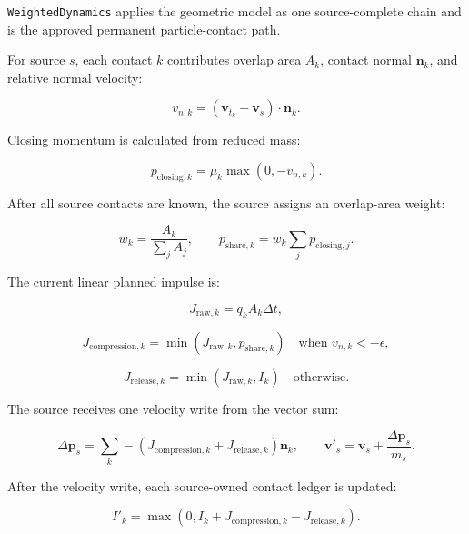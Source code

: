 \texttt{WeightedDynamics} applies the geometric model as one source-complete
chain and is the approved permanent particle-contact path.

For source \(s\), each contact \(k\) contributes overlap area \(A_k\), contact
normal \(\mathbf{n}_k\), and relative normal velocity:

\begin{equation}
v_{n,k} = (\mathbf{v}_{t_k}-\mathbf{v}_s)\cdot\mathbf{n}_k.
\end{equation}

Closing momentum is calculated from reduced mass:

\begin{equation}
p_{\mathrm{closing},k} = \mu_k \max(0,-v_{n,k}).
\end{equation}

After all source contacts are known, the source assigns an overlap-area weight:

\begin{equation}
w_k = \frac{A_k}{\sum_j A_j},
\qquad
p_{\mathrm{share},k} = w_k \sum_j p_{\mathrm{closing},j}.
\end{equation}

The current linear planned impulse is:

\begin{equation}
J_{\mathrm{raw},k}=q_k A_k\Delta t,
\end{equation}

\begin{equation}
J_{\mathrm{compression},k}
=
\min(J_{\mathrm{raw},k},p_{\mathrm{share},k})
\quad\text{when }v_{n,k}<-\epsilon,
\end{equation}

\begin{equation}
J_{\mathrm{release},k}
=
\min(J_{\mathrm{raw},k},I_k)
\quad\text{otherwise}.
\end{equation}

The source receives one velocity write from the vector sum:

\begin{equation}
\Delta\mathbf{p}_s
=
\sum_k
-(J_{\mathrm{compression},k}+J_{\mathrm{release},k})\mathbf{n}_k,
\qquad
\mathbf{v}'_s=\mathbf{v}_s+\frac{\Delta\mathbf{p}_s}{m_s}.
\end{equation}

After the velocity write, each source-owned contact ledger is updated:

\begin{equation}
I'_k
=
\max(0,I_k+J_{\mathrm{compression},k}-J_{\mathrm{release},k}).
\end{equation}

